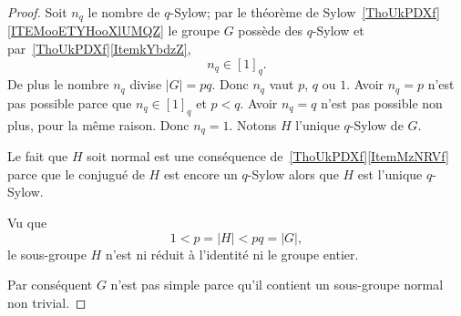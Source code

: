 \begin{proof}
	Soit \( n_q\) le nombre de \( q\)-Sylow; par le théorème de Sylow~\ref{ThoUkPDXf}\ref{ITEMooETYHooXlUMQZ} le groupe \( G\) possède des \( q\)-Sylow et par~\ref{ThoUkPDXf}\ref{ItemkYbdzZ},
	\begin{equation}
		n_q\in[1]_q.
	\end{equation}
	De plus le nombre \( n_q\) divise \( | G |=pq\). Donc \( n_q\) vaut \( p\), \( q\) ou \( 1\). Avoir \( n_q=p\) n'est pas possible parce que \( n_q\in[1]_q\) et \( p<q\). Avoir \( n_q=q\) n'est pas possible non plus, pour la même raison. Donc \( n_q=1\). Notons \( H\) l'unique \( q\)-Sylow de \( G\).

	Le fait que \( H\) soit normal est une conséquence de~\ref{ThoUkPDXf}\ref{ItemMzNRVf} parce que le conjugué de \( H\) est encore un \( q\)-Sylow alors que \( H\) est l'unique \( q\)-Sylow.

	Vu que
	\begin{equation}
		1<p=| H |<pq=| G |,
	\end{equation}
	le sous-groupe \( H \) n'est ni réduit à l'identité ni le groupe entier.

	Par conséquent \( G\) n'est pas simple parce qu'il contient un sous-groupe normal non trivial.
\end{proof}

